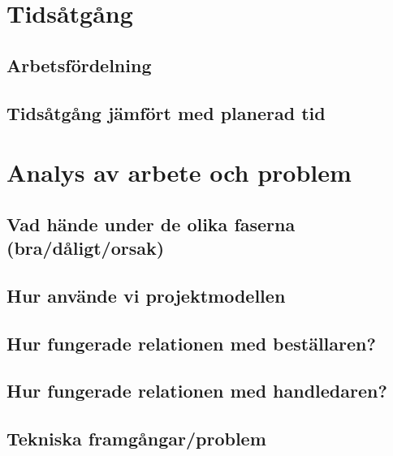 \documentclass[a4paper,12pt,fleqn]{article}
\begin{document}
\addto\captionsswedish{\renewcommand{\contentsname}{Innehållsförteckning}}

\tableofcontents
\newpage
\listoffigures
\thispagestyle{fancy}
\newpage



\section{Tidsåtgång}
\subsection{Arbetsfördelning}
\subsection{Tidsåtgång jämfört med planerad tid}
\section{Analys av arbete och problem}
\subsection{Vad hände under de olika faserna (bra/dåligt/orsak)}
\subsection{Hur använde vi projektmodellen}
\subsection{Hur fungerade relationen med beställaren?}
\subsection{Hur fungerade relationen med handledaren?}
\subsection{Tekniska framgångar/problem}
\end{document}
